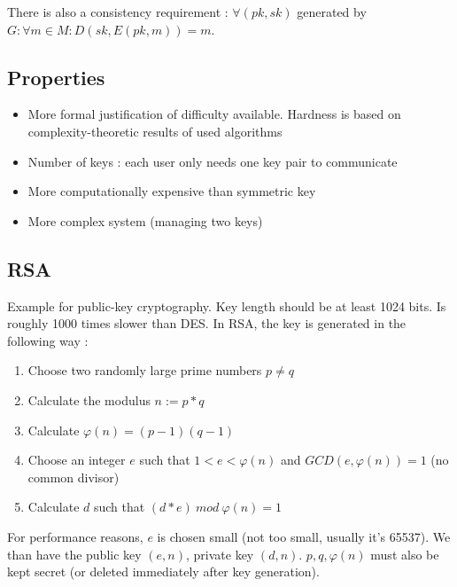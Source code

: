 There is also a consistency requirement : $\forall (pk, sk)$ generated by $G : \forall m \in M : D(sk, E(pk, m)) = m$.

\subsection{Properties}

\begin{minipage}[t]{0.45\textwidth}
    \begin{itemize}
        \item More formal justification of difficulty available. Hardness is based on complexity-theoretic results of used algorithms
        \item Number of keys : each user only needs one key pair to communicate
    \end{itemize}
\end{minipage}
\hfill
\begin{minipage}[t]{0.45\textwidth}
    \begin{itemize}
        \item More computationally expensive than symmetric key
        \item More complex system (managing two keys)
    \end{itemize}
\end{minipage}

\subsection{RSA}

Example for public-key cryptography. Key length should be at least 1024 bits. Is roughly 1000 times slower than DES. In RSA, the key is generated in the following way :
\begin{enumerate}
    \item Choose two randomly large prime numbers $p \neq q$
    \item Calculate the modulus $n := p * q$
    \item Calculate $\varphi(n) = (p-1)(q-1)$
    \item Choose an integer $e$ such that $1 < e < \varphi(n)$ and $GCD(e, \varphi(n)) = 1$ (no common divisor)
    \item Calculate $d$ such that $(d * e)\ mod\ \varphi(n) = 1$
\end{enumerate}

For performance reasons, $e$ is chosen small (not too small, usually it's 65537). We than have the public key $(e, n)$, private key $(d, n)$. $p, q, \varphi(n)$ must also be kept secret (or deleted immediately after key generation).

